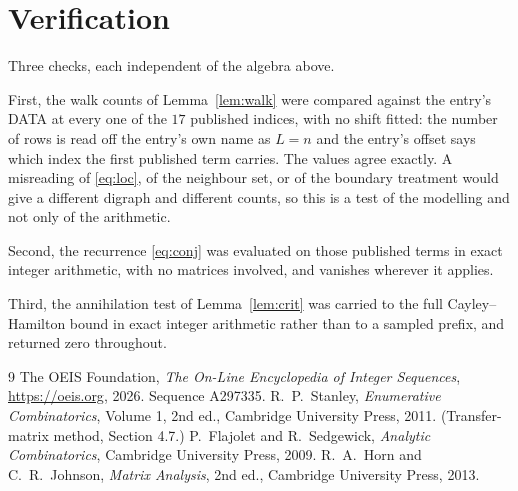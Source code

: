 \documentclass[11pt,a4paper]{article}
\theoremstyle{plain}
\theoremstyle{definition}
\begin{document}
\section{Verification}

Three checks, each independent of the algebra above.

First, the walk counts of Lemma~\ref{lem:walk} were compared against the entry's DATA at
every one of the $17$ published indices, with no shift fitted: the number of rows is
read off the entry's own name as $L=n$ and the entry's offset says which index the first
published term carries. The values agree exactly. A misreading of \eqref{eq:loc}, of the
neighbour set, or of the boundary treatment would give a different digraph and different
counts, so this is a test of the modelling and not only of the arithmetic.

Second, the recurrence \eqref{eq:conj} was evaluated on those published terms in exact
integer arithmetic, with no matrices involved, and vanishes wherever it applies.

Third, the annihilation test of Lemma~\ref{lem:crit} was carried to the full
Cayley--Hamilton bound in exact integer arithmetic rather than to a sampled prefix, and
returned zero throughout.

\begin{thebibliography}{9}
 The OEIS Foundation, \emph{The On-Line Encyclopedia of Integer
Sequences}, \url{https://oeis.org}, 2026. Sequence A297335.
 R.~P.~Stanley, \emph{Enumerative Combinatorics}, Volume 1, 2nd ed.,
Cambridge University Press, 2011. (Transfer-matrix method, Section 4.7.)
 P.~Flajolet and R.~Sedgewick, \emph{Analytic Combinatorics}, Cambridge
University Press, 2009.
 R.~A.~Horn and C.~R.~Johnson, \emph{Matrix Analysis}, 2nd ed., Cambridge
University Press, 2013.
\end{thebibliography}
\end{document}
